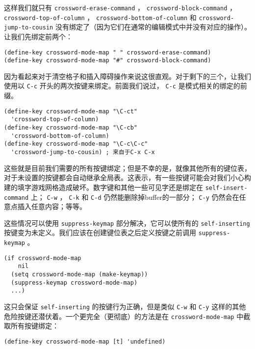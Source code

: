 这样我们就只有 \texttt{crossword-erase-command} ， \texttt{crossword-block-command} ， \texttt{crossword-top-of-column} ， \texttt{crossword-bottom-of-column} 和 \texttt{crossword-jump-to-cousin} 没有绑定了（因为它们在通常的编辑模式中并没有对应的操作）。让我们先绑定前两个：

\begin{verbatim}
(define-key crossword-mode-map " " crossword-erase-command)
(define-key crossword-mode-map "#" crossword-block-command)
\end{verbatim}

因为看起来对于清空格子和插入障碍操作来说这很直观。对于剩下的三个，让我们使用以 \verb|C-c| 开头的两次按键来绑定。前面我们说过， \verb|C-c| 是模式相关的绑定的前缀。

\begin{verbatim}
(define-key crossword-mode-map "\C-ct"
  'crossword-top-of-column)
(define-key crossword-mode-map "\C-cb"
  'crossword-bottom-of-column)
(define-key crossword-mode-map "\C-c\C-c"
  'crossword-jump-to-cousin) ; 来自于C-x C-x
\end{verbatim}

这些就是目前我们需要的所有按键绑定；但是不幸的是，就像其他所有的键位表，对于未设置的按键都会自动继承全局表。这表示，有一些按键可能会对我们小心构建的填字游戏网格造成破坏。数字键和其他一些可见字还是绑定在 \texttt{self-insert-command} 上； \verb|C-w| ， \verb|C-k| 和 \verb|C-d| 仍然能删除掉buffer的一部分； \verb|C-y| 仍然会在任意点插入任意内容；等等。

这些情况可以使用 \texttt{suppress-keymap} 部分解决，它可以使所有的 \texttt{self-inserting} 按键变为未定义。我们应该在创建键位表之后定义按键之前调用 \texttt{suppress-keymap} 。

\begin{verbatim}
(if crossword-mode-map
    nil
  (setq crossword-mode-map (make-keymap))
  (suppress-keymap crossword-mode-map)
  ...)
\end{verbatim}

这只会保证 \texttt{self-inserting} 的按键行为正确，但是类似 \verb|C-w| 和 \verb|C-y| 这样的其他危险按键还潜伏着。一个更完全（更彻底）的方法是在 \texttt{crossword-mode-map} 中截取所有按键绑定：

\begin{verbatim}
(define-key crossword-mode-map [t] 'undefined)
\end{verbatim}

